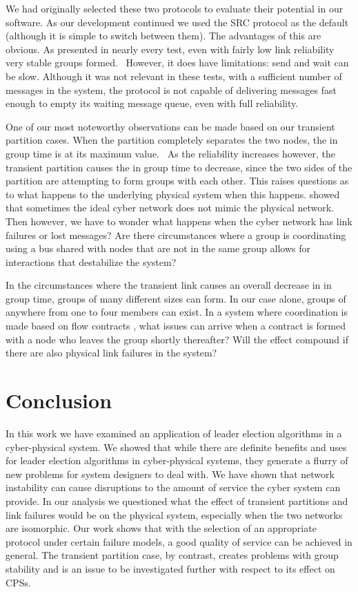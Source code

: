 \documentclass{llncs}
\begin{document}
We had originally selected these two protocols to evaluate their potential in our software. As our development continued we used the SRC protocol as the default (although it is simple to switch between them). The advantages of this are obvious. As presented in nearly every test, even with fairly low link reliability very stable groups formed.  However, it does have limitations: send and wait can be slow. Although it was not relevant in these tests, with a sufficient number of messages in the system, the protocol is not capable of delivering messages fast enough to empty its waiting message queue, even with full reliability.

One of our most noteworthy observations can be made based on our transient partition cases. When the partition completely separates the two nodes, the in group time is at its maximum value.  As the reliability increases however, the transient partition causes the in group time to decrease, since the two sides of the partition are attempting to form groups with each other. This raises questions as to what happens to the underlying physical system when this happens.
\cite{NETWORKTOPOLOGY} showed that sometimes the ideal cyber network does not mimic the physical network. Then however, we have to wonder what happens when the cyber network has link failures or lost messages? Are there circumstances where a group is coordinating using a bus shared with nodes that are not in the same group allows for interactions that destabilize the system?

In the circumstances where the transient link causes an overall decrease in in group time, groups of many different sizes can form. In our case alone, groups of anywhere from one to four members can exist. In a system where coordination is made based on flow contracts \cite{LOADBALANCING}, what issues can arrive when a contract is formed with a node who leaves the group shortly thereafter? Will the effect compound if there are also physical link failures in the system?

\section{Conclusion}

In this work we have examined an application of leader election algorithms in a cyber-physical system. We showed that while there are definite benefits and uses for leader election algorithms in cyber-physical systems, they generate a flurry of new problems for system designers to deal with. We have shown that network instability can cause disruptions to the amount of service the cyber system can provide. In our analysis we questioned what the effect of transient partitions and link failures would be on the physical system, especially when the two networks are isomorphic. Our work shows that with the selection of an appropriate protocol under certain failure models, a good quality of service can be achieved in general. The transient partition case, by contrast, creates problems with group stability and is an issue to be investigated further with respect to its effect on CPSs.
\end{document}
